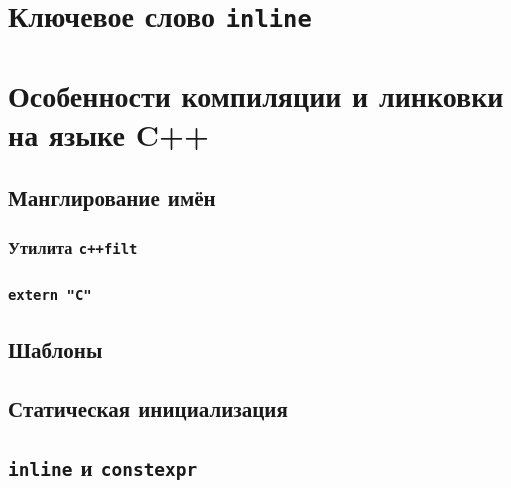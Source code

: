 \documentclass{article}
\begin{document}
\section{Ключевое слово \texttt{inline}}
\section{Особенности компиляции и линковки на языке C++}
\subsection*{Манглирование имён}
\subsubsection*{Утилита \texttt{c++filt}}
\subsubsection*{\texttt{extern "C"}}
\subsection*{Шаблоны}
\subsection*{Статическая инициализация}
\subsection*{\texttt{inline} и \texttt{constexpr}}
\end{document}

